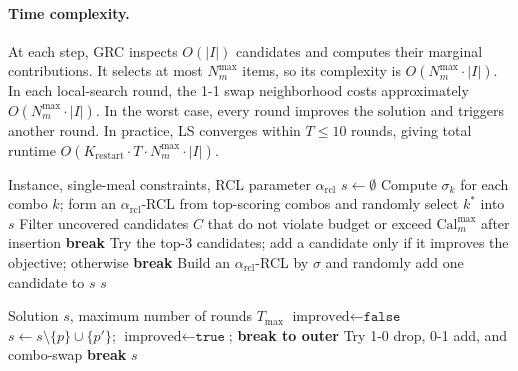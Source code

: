 \documentclass[a4paper]{article}
\begin{document}
\paragraph{Time complexity.}At each step, GRC inspects $O(|I|)$ candidates and computes their marginal contributions. It selects at most $N^{\max}_m$ items, so its complexity is $O(N^{\max}_m\cdot |I|)$. In each local-search round, the 1-1 swap neighborhood costs approximately $O(N^{\max}_m\cdot |I|)$. In the worst case, every round improves the solution and triggers another round. In practice, LS converges within $T\le 10$ rounds, giving total runtime $O(K_{\text{restart}}\cdot T\cdot N^{\max}_m\cdot |I|)$.

\begin{algorithm}[h]
\caption{Greedy Randomized Construction (GRC) sub-procedure}
\label{alg:grc}
\begin{algorithmic}[1]
\Require Instance, single-meal constraints, RCL parameter $\alpha_{\text{rcl}}$
\State $s \gets \emptyset$
    \State Compute $\sigma_k$ for each combo $k$; form an $\alpha_{\text{rcl}}$-RCL from top-scoring combos and randomly select $k^*$ into $s$ 
\EndIf
{}
    \State Filter uncovered candidates $C$ that do not violate budget or exceed $\text{Cal}^{\max}_m$ after insertion
     \textbf{break} \EndIf
        \State Try the top-3 candidates; add a candidate only if it improves the objective; otherwise \textbf{break}
    \Else
        \State Build an $\alpha_{\text{rcl}}$-RCL by $\sigma$ and randomly add one candidate to $s$
    \EndIf
\EndWhile
\State \Return $s$
\end{algorithmic}
\end{algorithm}

\begin{algorithm}[h]
\caption{Local Search (1-1 swap / 1-0 drop / 0-1 add / combo-swap)}
\label{alg:ls}
\begin{algorithmic}[1]
\Require Solution $s$, maximum number of rounds $T_{\max}$
  \State $\text{improved} \gets \texttt{false}$
      \State $s \gets s\setminus\{p\}\cup\{p'\}$; $\text{improved}\gets\texttt{true}$; \textbf{break to outer}
    \EndIf
  \EndFor
   Try 1-0 drop, 0-1 add, and combo-swap \EndIf
   \textbf{break} \EndIf
\EndFor
\State \Return $s$
\end{algorithmic}
\end{algorithm}
\end{document}
